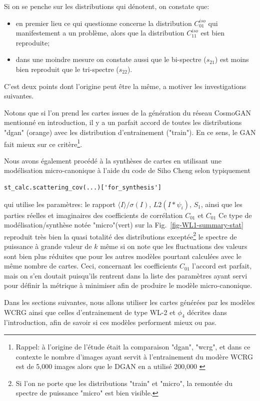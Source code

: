 \documentclass[12pt,twoside]{article}
\newcommand{\itemb}{\item[$\bullet$]}
\begin{document}
Si on se penche sur les distributions qui dénotent, on constate que:
\begin{itemize}
\itemb en premier lieu ce qui questionne concerne la distribution $C_{01}^{iso}$ qui manifestement a un problème, alors que la distribution $C_{11}^{iso}$ est bien reproduite;
\itemb dans une moindre mesure on constate aussi que le bi-spectre ($s_{21}$) est moins bien reproduit que le tri-spectre ($s_{22}$).
\end{itemize} 
C'est deux points dont l'origine peut être la même, a motiver les investigations suivantes.

Notons que si l'on prend les cartes  issues de la génération du réseau CosmoGAN mentionné en introduction, il y a un parfait accord de toutes les distributions "dgan" (orange) avec les distribution d'entrainement ("train"). En ce sens, le GAN fait mieux sur ce critère\footnote{Rappel: à l'origine de l'étude était la comparaison "dgan", "wcrg", et dans ce contexte le nombre d'images ayant servit à l'entrainement du modère WCRG est de 5,000 images alors que le DGAN en a utilisé 200,000 \citep{2019ComAC...6....1M}}.  

Nous avons également procédé à la synthèses de cartes en utilisant une modélisation micro-canonique \citep{2023arXiv230617210C} à l'aide du code de Siho Cheng selon typiquement 
\begin{lstlisting}[language=iPython]
 st_calc.scattering_cov(...)['for_synthesis']
\end{lstlisting}
qui utilise les paramètres: le rapport $\langle I\rangle/\sigma(I)$, $L2(I\ast \psi_i)$, $S_1$, ainsi que les parties réelles et imaginaires des coefficients de corrélation $C_{01}$ et $C_{01}$
Ce type de modélisation/synthèse notée "micro"(vert) sur la Fig.~\ref{fig-WL1-summary-stat} reproduit très bien la quasi totalité des distributions exceptée\footnote{Si l'on ne porte que les distributions "train" et "micro", la remontée du spectre de puissance "micro" est bien visible.} le spectre de puissance à grande valeur de $k$ même si on note que les fluctuations des valeurs sont bien plus réduites que pour les autres modèles pourtant calculées avec le même nombre de cartes. Ceci, concernant les coefficients $C_{01}$ l'accord est parfait, mais on s'en doutait puisqu'ils rentrent dans la liste des paramètres ayant servi pour définir la métrique à minimiser afin de produire le modèle micro-canonique.

Dans les sections suivantes, nous allons utiliser les cartes générées par les modèles WCRG ainsi que celles d'entrainement de type WL-2 et $\phi_4$ décrites dans l'introduction, afin de savoir si ces modèles performent mieux ou pas.
%
\end{document}
